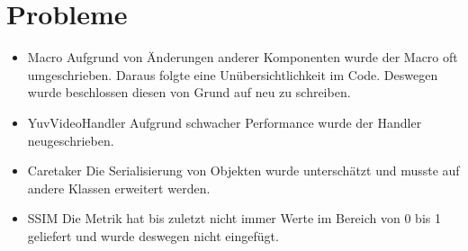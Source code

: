 \chapter{Probleme}
\begin{itemize}
\item Macro \newline
Aufgrund von Änderungen anderer Komponenten wurde der Macro oft umgeschrieben.
Daraus folgte eine Unübersichtlichkeit im Code.
Deswegen wurde beschlossen diesen von Grund auf neu zu schreiben.
\item YuvVideoHandler \newline
Aufgrund schwacher Performance wurde der Handler neugeschrieben.
\item Caretaker \newline
Die Serialisierung von Objekten wurde unterschätzt und musste auf andere Klassen erweitert werden.
\item SSIM \newline
Die Metrik hat bis zuletzt nicht immer Werte im Bereich von 0 bis 1 geliefert und wurde deswegen nicht eingefügt.
\end{itemize}
